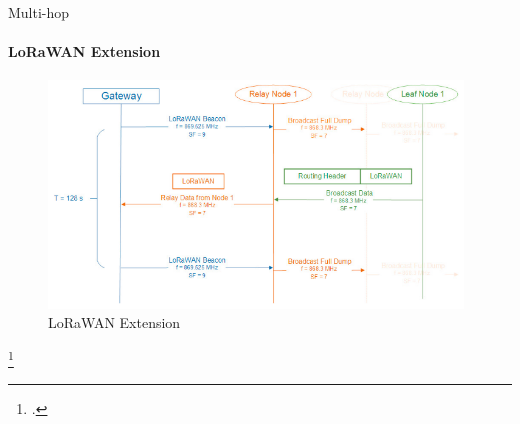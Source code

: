 \begin{frame}{Multi-hop}
\framesubtitle{LoRaWAN Extension}
\begin{figure}[H]
    \centering
    \includegraphics[width=0.98\textwidth]{presentation.tex/fig/lorawanextension.png}
    \caption{LoRaWAN Extension\footnotemark}
\end{figure}

\footcitetext{DIAS2018424}
\end{frame}

